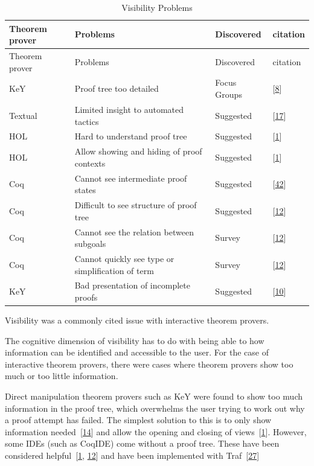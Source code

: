 \documentclass[
]{article}
\begin{document}
\hypertarget{tbl:visibility}{}
\begin{longtable}[]{@{}llll@{}}
\caption{\label{tbl:visibility}Visibility Problems}\tabularnewline
\toprule
Theorem prover & Problems & Discovered & citation \\
\midrule
\endfirsthead
\toprule
Theorem prover & Problems & Discovered & citation \\
\midrule
\endhead
KeY & Proof tree too detailed & Focus Groups &
{[}\protect\hyperlink{ref-beckert_usability_2015}{8}{]} \\
Textual & Limited insight to automated tactics & Suggested &
{[}\protect\hyperlink{ref-grebing_usability_2020}{17}{]} \\
HOL & Hard to understand proof tree & Suggested &
{[}\protect\hyperlink{ref-aitken_interactive_1998}{1}{]} \\
HOL & Allow showing and hiding of proof contexts & Suggested &
{[}\protect\hyperlink{ref-aitken_interactive_1998}{1}{]} \\
Coq & Cannot see intermediate proof states & Suggested &
{[}\protect\hyperlink{ref-zacchiroli_user_2007}{42}{]} \\
Coq & Difficult to see structure of proof tree & Suggested &
{[}\protect\hyperlink{ref-berman_development_2014}{12}{]} \\
Coq & Cannot see the relation between subgoals & Survey &
{[}\protect\hyperlink{ref-berman_development_2014}{12}{]} \\
Coq & Cannot quickly see type or simplification of term & Survey &
{[}\protect\hyperlink{ref-berman_development_2014}{12}{]} \\
KeY & Bad presentation of incomplete proofs & Suggested &
{[}\protect\hyperlink{ref-beckert_evaluating_2012}{10}{]} \\
\bottomrule
\end{longtable}

Visibility was a commonly cited issue with interactive theorem provers.

The cognitive dimension of visibility has to do with being able to how
information can be identified and accessible to the user. For the case
of interactive theorem provers, there were cases where theorem provers
show too much or too little information.

Direct manipulation theorem provers such as KeY were found to show too
much information in the proof tree, which overwhelms the user trying to
work out why a proof attempt has failed. The simplest solution to this
is to only show information
needed~{[}\protect\hyperlink{ref-eastaughffe_support_1998}{14}{]} and
allow the opening and closing of
views~{[}\protect\hyperlink{ref-aitken_interactive_1998}{1}{]}. However,
some IDEs (such as CoqIDE) come without a proof tree. These have been
considered
helpful~{[}\protect\hyperlink{ref-aitken_interactive_1998}{1},
\protect\hyperlink{ref-berman_development_2014}{12}{]} and have been
implemented with
Traf~{[}\protect\hyperlink{ref-kawabata_traf_2018}{27}{]}
\end{document}
